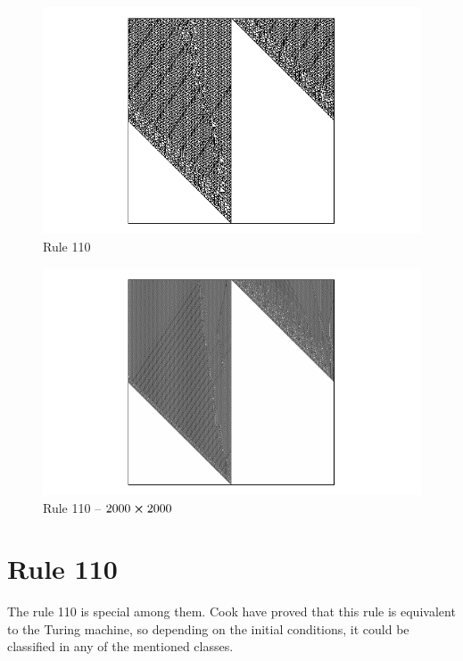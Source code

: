 \begin{figure}
 \centering
 \includegraphics[trim = 40mm 0mm 0mm 0mm, width=1.7\textwidth]{./img/110_500}
 \caption{Rule 110}
\end{figure}

\begin{figure}
 \centering
 \includegraphics[trim = 40mm 0mm 0mm 0mm, width=1.7\textwidth]{./img/110_2000}
 \caption{Rule 110 -- $2000 \cross 2000$}
\end{figure}


\section{Rule 110}
The rule 110 is special among them. Cook have proved \cite{cook} that this rule is equivalent to the Turing machine, so depending on the initial conditions, it could be classified in any of the mentioned classes.



